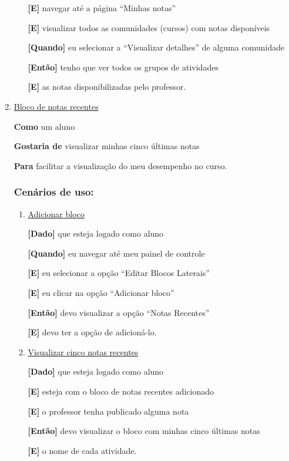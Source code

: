 \begin{enumerate}
\begin{enumerate}
\textbf{[E]} navegar até a página ``Minhas notas''

\textbf{[E]} visualizar todos as comunidades (cursos) com notas disponíveis

\textbf{[Quando]} eu selecionar a ``Visualizar detalhes'' de alguma comunidade

\textbf{[Então]} tenho que ver todos os grupos de atividades

\textbf{[E]} as notas disponibilizadas pelo professor.
\end{enumerate}

\item \underline{Bloco de notas recentes}

\textbf{Como} um aluno

\textbf{Gostaria de} visualizar minhas cinco últimas notas

\textbf{Para} facilitar a visualização do meu desempenho no curso.

\subsubsection*{Cenários de uso:}

\begin{enumerate}

\item \underline{Adicionar bloco}

\textbf{[Dado]} que esteja logado como aluno

\textbf{[Quando]} eu navegar até meu painel de controle

\textbf{[E]} eu selecionar a opção ``Editar Blocos Laterais''

\textbf{[E]} eu clicar na opção ``Adicionar bloco''

\textbf{[Então]} devo visualizar a opção ``Notas Recentes''

\textbf{[E]} devo ter a opção de adicioná-lo.

\item \underline{Visualizar cinco notas recentes}

\textbf{[Dado]} que esteja logado como aluno

\textbf{[E]} esteja com o bloco de notas recentes adicionado

\textbf{[E]} o professor tenha publicado alguma nota

\textbf{[Então]} devo visualizar o bloco com minhas cinco últimas notas

\textbf{[E]} o nome de cada atividade.


\end{enumerate}
\end{enumerate}

